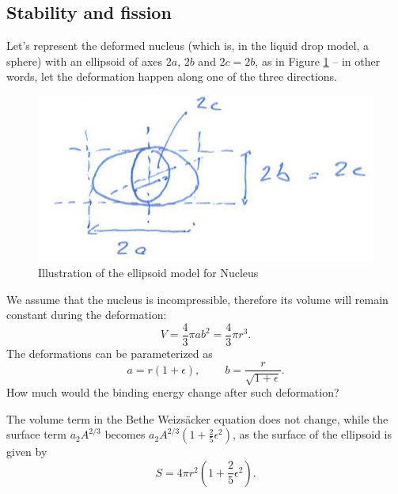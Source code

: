 \subsection{Stability and fission}
Let's represent the deformed nucleus (which is, in the liquid drop model, a sphere) with an ellipsoid of axes \(2a\), \(2b\) and \(2c=2b\), as in Figure \ref{fig:nuclear-physics3-fig3} -- in other words, let the deformation happen along one of the three directions.
\begin{figure}
    \centering
    \includegraphics[scale=0.5]{Figures/nuclear-physics3-fig3.pdf}
    \caption{Illustration of the ellipsoid model for Nucleus}
    \label{fig:nuclear-physics3-fig3}
\end{figure}
We assume that the nucleus is incompressible, therefore its volume will remain constant during the deformation:
\begin{equation*}
    V = \frac{4}{3}\pi ab^2 = \frac{4}{3}\pi r^3.
\end{equation*}
The deformations can be parameterized as 
\begin{equation*}
    a = r(1+\epsilon), \;\;\;\;\;\;\;\; b = \frac{r}{\sqrt{1+\epsilon}}.
\end{equation*}
How much would the binding energy change after such deformation?

The volume term in the Bethe Weizs\"acker equation does not change, while the surface term $a_2A^{2/3}$ becomes $a_2A^{2/3}(1+\frac{2}{5}\epsilon^2)$, as the surface of the ellipsoid is given by
\begin{equation*}
    S = 4\pi r^2 \left(1+\frac{2}{5}\epsilon^2\right).
\end{equation*}


